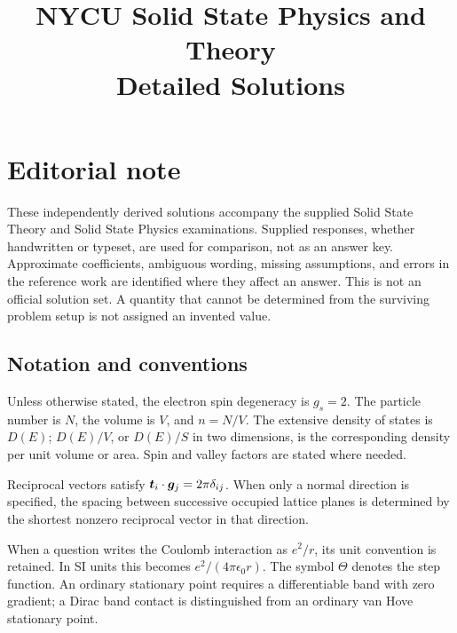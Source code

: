 \documentclass[11pt,a4paper,oneside]{book}
\title{NYCU Solid State Physics and Theory\\[1em]\Large Detailed Solutions}
\author{}
\date{}
\begin{document}
\frontmatter
\maketitle
\chapter*{Editorial note}
These independently derived solutions accompany the supplied Solid State Theory and Solid State Physics examinations. Supplied responses, whether handwritten or typeset, are used for comparison, not as an answer key. Approximate coefficients, ambiguous wording, missing assumptions, and errors in the reference work are identified where they affect an answer. This is not an official solution set. A quantity that cannot be determined from the surviving problem setup is not assigned an invented value.

\section*{Notation and conventions}
Unless otherwise stated, the electron spin degeneracy is $g_s=2$. The particle number is $N$, the volume is $V$, and $n=N/V$. The extensive density of states is $D(E)$; $D(E)/V$, or $D(E)/S$ in two dimensions, is the corresponding density per unit volume or area. Spin and valley factors are stated where needed.

Reciprocal vectors satisfy $\boldsymbol{t}_i\cdot\boldsymbol{g}_j=2\pi\delta_{ij}$. When only a normal direction is specified, the spacing between successive occupied lattice planes is determined by the shortest nonzero reciprocal vector in that direction.

When a question writes the Coulomb interaction as $e^2/r$, its unit convention is retained. In SI units this becomes $e^2/(4\pi\epsilon_0r)$. The symbol $\Theta$ denotes the step function. An ordinary stationary point requires a differentiable band with zero gradient; a Dirac band contact is distinguished from an ordinary van Hove stationary point.
\tableofcontents
\mainmatter











\end{document}

